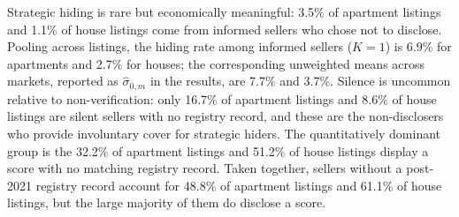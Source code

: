 \noindent Strategic hiding is rare but economically meaningful: 3.5\% of apartment listings and 1.1\% of house listings come from informed sellers who chose not to disclose. Pooling across listings, the hiding rate among informed sellers ($K=1$) is 6.9\% for apartments and 2.7\% for houses; the corresponding unweighted means across markets, reported as $\hat\sigma_{0,m}$ in the results, are 7.7\% and 3.7\%. Silence is uncommon relative to non-verification: only 16.7\% of apartment listings and 8.6\% of house listings are silent sellers with no registry record, and these are the non-disclosers who provide involuntary cover for strategic hiders. The quantitatively dominant group is the 32.2\% of apartment listings and 51.2\% of house listings display a score with no matching registry record. Taken together, sellers without a post-2021 registry record account for 48.8\% of apartment listings and 61.1\% of house listings, but the large majority of them do disclose a score.
